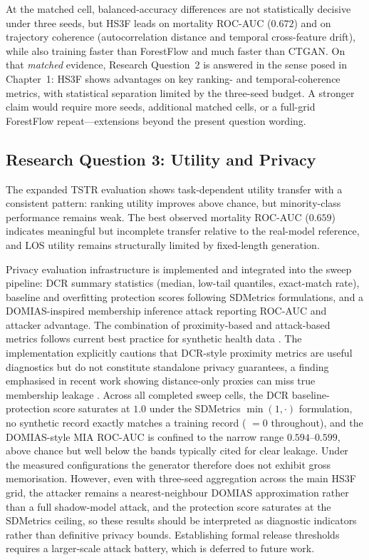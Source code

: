 At the matched cell, balanced-accuracy differences are not statistically decisive under three seeds, but HS3F leads on mortality ROC-AUC ($0.672$) and on trajectory coherence (autocorrelation distance and temporal cross-feature drift), while also training faster than ForestFlow and much faster than CTGAN. On that \emph{matched} evidence, Research Question~2 is answered in the sense posed in Chapter~1: HS3F shows advantages on key ranking- and temporal-coherence metrics, with statistical separation limited by the three-seed budget. A stronger claim would require more seeds, additional matched cells, or a full-grid ForestFlow repeat---extensions beyond the present question wording.

\subsection{Research Question 3: Utility and Privacy}

The expanded TSTR evaluation shows task-dependent utility transfer with a consistent pattern: ranking utility improves above chance, but minority-class performance remains weak. The best observed mortality ROC-AUC ($0.659$) indicates meaningful but incomplete transfer relative to the real-model reference, and LOS utility remains structurally limited by fixed-length generation.

Privacy evaluation infrastructure is implemented and integrated into the sweep pipeline: DCR summary statistics (median, low-tail quantiles, exact-match rate), baseline and overfitting protection scores following SDMetrics formulations, and a DOMIAS-inspired membership inference attack reporting ROC-AUC and attacker advantage. The combination of proximity-based and attack-based metrics follows current best practice for synthetic health data \cite{kaabachi2025scoping,breugel2023domias}. The implementation explicitly cautions that DCR-style proximity metrics are useful diagnostics but do not constitute standalone privacy guarantees, a finding emphasised in recent work showing distance-only proxies can miss true membership leakage \cite{yao2025dcrdelusion}. Across all completed sweep cells, the DCR baseline-protection score saturates at $1.0$ under the SDMetrics $\min(1,\cdot)$ formulation, no synthetic record exactly matches a training record ( $=0$ throughout), and the DOMIAS-style MIA ROC-AUC is confined to the narrow range $0.594$--$0.599$, above chance but well below the bands typically cited for clear leakage. Under the measured configurations the generator therefore does not exhibit gross memorisation. However, even with three-seed aggregation across the main HS3F grid, the attacker remains a nearest-neighbour DOMIAS approximation rather than a full shadow-model attack, and the protection score saturates at the SDMetrics ceiling, so these results should be interpreted as diagnostic indicators rather than definitive privacy bounds. Establishing formal release thresholds requires a larger-scale attack battery, which is deferred to future work.

